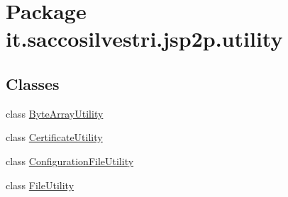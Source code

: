 \hypertarget{namespaceit_1_1saccosilvestri_1_1jsp2p_1_1utility}{
\section{\-Package it.saccosilvestri.jsp2p.utility}
\label{namespaceit_1_1saccosilvestri_1_1jsp2p_1_1utility}
}
\subsection*{\-Classes}
\begin{DoxyCompactItemize}
\item 
class \hyperlink{classit_1_1saccosilvestri_1_1jsp2p_1_1utility_1_1_byte_array_utility}{\-Byte\-Array\-Utility}
\item 
class \hyperlink{classit_1_1saccosilvestri_1_1jsp2p_1_1utility_1_1_certificate_utility}{\-Certificate\-Utility}
\item 
class \hyperlink{classit_1_1saccosilvestri_1_1jsp2p_1_1utility_1_1_configuration_file_utility}{\-Configuration\-File\-Utility}
\item 
class \hyperlink{classit_1_1saccosilvestri_1_1jsp2p_1_1utility_1_1_file_utility}{\-File\-Utility}
\end{DoxyCompactItemize}
